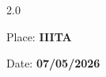 \begin{spacing}{2.0}
\noindent
\begin{minipage}[t]{0.4\textwidth}  
    \begin{flushleft} 
        Place: \textbf{IIITA}\\
    \end{flushleft}
\end{minipage}
\hfill
\begin{minipage}[t]{0.4\textwidth}
    \begin{flushright}         
        Date: \textbf{07/05/2026}\\       
    \end{flushright}
\end{minipage}
\par
{\studentsignatures} %
\end{spacing}


        
\cleardoublepage









